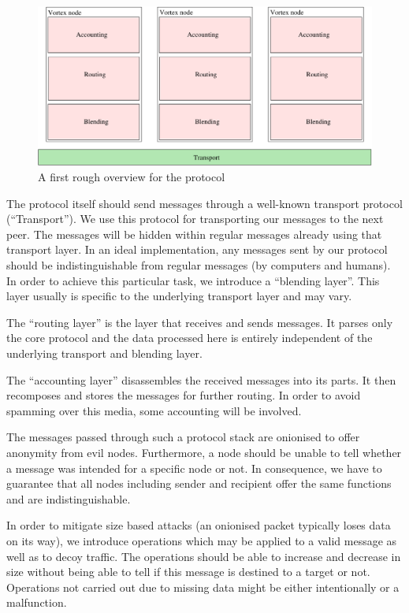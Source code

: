 \begin{figure}[h]
	\includegraphics[width=\columnwidth]{inc/roughProtocolDesign.pdf}
	\caption{A first rough overview for the protocol}
	\label{fig:roughProtocolDesign}
\end{figure}	

The protocol itself should send messages through a well-known transport protocol (``Transport''). We use this protocol for transporting our messages to the next peer. The messages will be hidden within regular messages already using that transport layer. In an ideal implementation, any messages sent by our protocol should be indistinguishable from regular messages (by computers and humans). In order to achieve this particular task, we introduce a ``blending layer''. This layer usually is specific to the underlying transport layer and may vary.

The ``routing layer'' is the layer that receives and sends messages. It parses only the core protocol and the data processed here is entirely independent of the underlying transport and blending layer.

The ``accounting layer'' disassembles the received messages into its parts. It then recomposes and stores the messages for further routing. In order to avoid spamming over this media, some accounting will be involved. 

The messages passed through such a protocol stack are onionised to offer anonymity from evil nodes. Furthermore, a node should be unable to tell whether a message was intended for a specific node or not. In consequence, we have to guarantee that all nodes including sender and recipient offer the same functions and are indistinguishable.

In order to mitigate size based attacks (an onionised packet typically loses data on its way), we introduce operations which may be applied to a valid message as well as to decoy traffic. The operations should be able to increase and decrease in size without being able to tell if this message is destined to a target or not. Operations not carried out due to missing data might be either intentionally or a malfunction.

